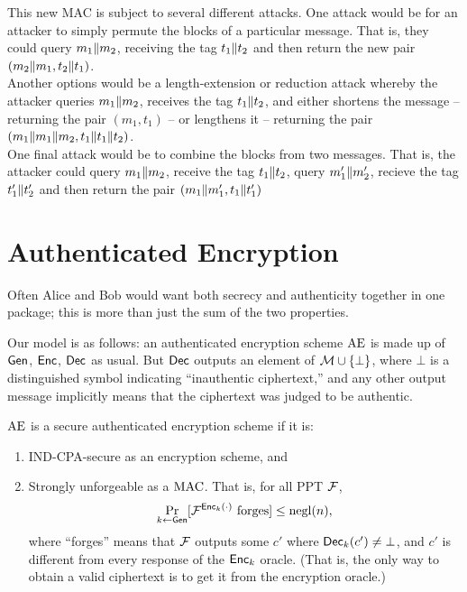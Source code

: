 \documentclass[11pt]{article}
\begin{document}
\begin{answer}
  This new MAC is subject to several different attacks. One attack
  would be for an attacker to simply permute the blocks of a
  particular message. That is, they could query \(m_1 \| m_2\),
  receiving the tag \(t_1 \| t_2\) and then return the
  new pair \((m_2 \| m_1, t_2 \| t_1)\). \\

  \noindent Another options would be a length-extension or reduction
  attack whereby the attacker queries \(m_1 \| m_2\), receives
  the tag \(t_1 \| t_2\), and either shortens the message --
  returning the pair \((m_1, t_1)\) -- or lengthens it -- returning
  the pair \((m_1 \| m_1 \| m_2, t_1
  \| t_1 \| t_2)\). \\

  \noindent One final attack would be to combine the blocks from two
  messages. That is, the attacker could query \(m_1 \| m_2\),
  receive the tag \(t_1 \| t_2\), query \(m_1' \| m_2'\),
  recieve the tag \(t_1' \| t_2'\) and then return the pair
  \((m_1 \| m_1', t_1 \| t_1')\)
\end{answer}

\section{Authenticated Encryption}
\label{sec:auth-encrypt}

Often Alice and Bob would want both secrecy and authenticity together
in one package; this is more than just the sum of the two properties.

Our model is as follows: an authenticated encryption scheme
$\text{AE}$ is made up of $\mathsf{Gen}$, $\mathsf{Enc}$, $\mathsf{Dec}$ as usual.
But $\mathsf{Dec}$ outputs an element of $\mathcal{M} \cup \{\bot\}$, where
$\bot$ is a distinguished symbol indicating ``inauthentic
ciphertext,'' and any other output message implicitly means that the
ciphertext was judged to be authentic.

\begin{definition}
  $\text{AE}$ is a secure authenticated encryption scheme if it is:
  \begin{enumerate}
  \item IND-CPA-secure as an encryption scheme, and
  \item Strongly unforgeable as a $\text{MAC}$.  That is, for all PPT
    $\mathcal{F}$,
    \[
    \Pr_{k \gets \mathsf{Gen}}[\mathcal{F}^{\mathsf{Enc}_k(\cdot)} \text{ forges}] \leq \operatorname{negl}(n),
    \]
    where ``forges'' means that $\mathcal{F}$ outputs some $c'$ where
    $\mathsf{Dec}_k(c') \neq \bot$, and $c'$ is different from every
    response of the $\mathsf{Enc}_{k}$ oracle.  (That is, the only way to
    obtain a valid ciphertext is to get it from the encryption
    oracle.)
  \end{enumerate}
\end{definition}
\end{document}
